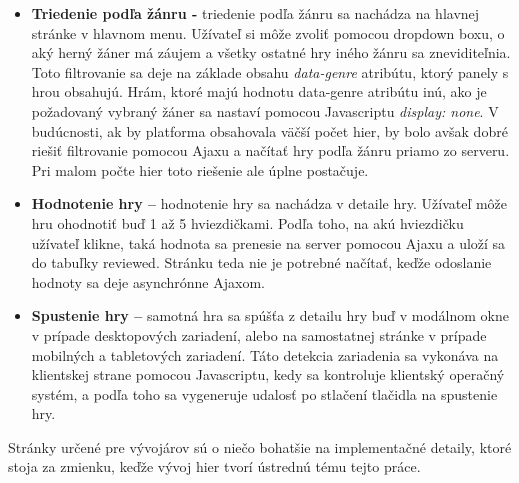\begin{itemize}  
\item \textbf{Triedenie podľa žánru -}  triedenie podľa žánru sa nachádza na hlavnej stránke v hlavnom menu. Užívateľ si môže zvoliť pomocou dropdown boxu, o aký herný žáner má záujem a všetky ostatné hry iného žánru sa zneviditeľnia. Toto filtrovanie sa deje na základe obsahu \textit{data-genre} atribútu, ktorý panely s hrou obsahujú. Hrám, ktoré majú hodnotu data-genre atribútu inú, ako je požadovaný vybraný žáner sa nastaví pomocou Javascriptu \textit{display: none}. V budúcnosti, ak by platforma obsahovala väčší počet hier,  by bolo avšak dobré riešiť filtrovanie pomocou Ajaxu a načítať hry podľa žánru  priamo zo serveru. Pri malom počte hier toto riešenie ale úplne postačuje.
\item \textbf{Hodnotenie hry –} hodnotenie hry sa nachádza v detaile hry. Užívateľ môže hru ohodnotiť buď 1 až 5 hviezdičkami. Podľa toho, na akú hviezdičku užívateľ klikne, taká hodnota sa prenesie na server pomocou Ajaxu a uloží sa do tabuľky reviewed. Stránku teda nie je potrebné načítať, keďže odoslanie hodnoty sa deje asynchrónne Ajaxom.
\item \textbf{Spustenie hry –} samotná hra sa spúšťa z detailu hry buď v modálnom okne v prípade desktopových zariadení, alebo na samostatnej stránke v prípade mobilných a tabletových zariadení. Táto detekcia zariadenia sa vykonáva na klientskej strane pomocou Javascriptu, kedy sa kontroluje klientský operačný systém, a podľa toho sa vygeneruje udalosť po stlačení tlačidla na spustenie hry.
\end{itemize}
Stránky určené pre vývojárov sú o niečo bohatšie na implementačné detaily, ktoré stoja za zmienku, keďže vývoj hier tvorí ústrednú tému tejto práce.  
